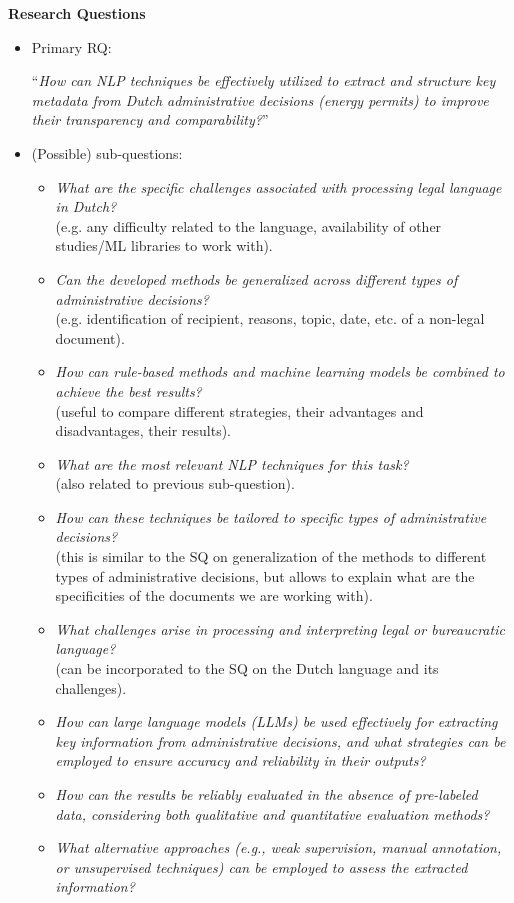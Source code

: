 \documentclass[11pt]{article}
\begin{document}
\textbf{Research Questions}
\begin{itemize}
\item Primary RQ:

“\textit{How can NLP techniques be effectively utilized to extract and structure key metadata from Dutch administrative decisions (energy permits) to improve their transparency and comparability?}”

\item (Possible) sub-questions:
    \begin{itemize}
        \item \textit{What are the specific challenges associated with processing legal language in Dutch?} \\ (e.g. any difficulty related to the language, availability of other studies/ML libraries to work with).
        \item \textit{Can the developed methods be generalized across different types of administrative decisions?} \\ (e.g. identification of recipient, reasons, topic, date, etc. of a non-legal document).
        \item \textit{How can rule-based methods and machine learning models be combined to achieve the best results?} \\ (useful to compare different strategies, their advantages and disadvantages, their results).
        \item \textit{What are the most relevant NLP techniques for this task?} \\ (also related to previous sub-question).
        \item \textit{How can these techniques be tailored to specific types of administrative decisions?} \\(this is similar to the SQ on generalization of the methods to different types of administrative decisions, but allows to explain what are the specificities of the documents we are working with).
        \item \textit{What challenges arise in processing and interpreting legal or bureaucratic language?} \\ (can be incorporated to the SQ on the Dutch language and its challenges). 
        \item \textit{How can large language models (LLMs) be used effectively for extracting key information from administrative decisions, and what strategies can be employed to ensure accuracy and reliability in their outputs?}
        \item \textit{How can the results be reliably evaluated in the absence of pre-labeled data, considering both qualitative and quantitative evaluation methods?}  
        \item \textit{What alternative approaches (e.g., weak supervision, manual annotation, or unsupervised techniques) can be employed to assess the extracted information?}
    \end{itemize}
\end{itemize}
\end{document}
